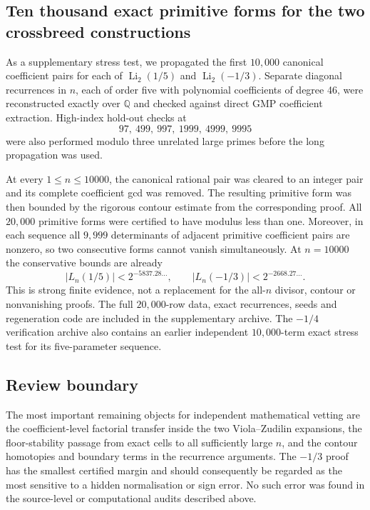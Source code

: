 \documentclass[11pt]{amsart}
\newcommand{\Li}{\operatorname{Li}}
\newcommand{\Q}{\mathbb Q}
\theoremstyle{plain}
\theoremstyle{remark}\newtheorem{remark}[theorem]{Remark}
\numberwithin{equation}{section}
\begin{document}
\subsection{Ten thousand exact primitive forms for the two crossbreed constructions}
As a supplementary stress test, we propagated the first $10{,}000$ canonical coefficient pairs for each of $\Li_2(1/5)$ and $\Li_2(-1/3)$.  Separate diagonal recurrences in $n$, each of order five with polynomial coefficients of degree 46, were reconstructed exactly over $\Q$ and checked against direct GMP coefficient extraction.  High-index hold-out checks at
\[
 97,\ 499,\ 997,\ 1999,\ 4999,\ 9995
\]
were also performed modulo three unrelated large primes before the long propagation was used.

At every $1\le n\le10000$, the canonical rational pair was cleared to an integer pair and its complete coefficient gcd was removed.  The resulting primitive form was then bounded by the rigorous contour estimate from the corresponding proof.  All $20{,}000$ primitive forms were certified to have modulus less than one.  Moreover, in each sequence all $9{,}999$ determinants of adjacent primitive coefficient pairs are nonzero, so two consecutive forms cannot vanish simultaneously.  At $n=10000$ the conservative bounds are already
\[
 |L_n(1/5)|<2^{-5837.28\ldots},\qquad
 |L_n(-1/3)|<2^{-2668.27\ldots}.
\]
This is strong finite evidence, not a replacement for the all-$n$ divisor, contour or nonvanishing proofs.  The full $20{,}000$-row data, exact recurrences, seeds and regeneration code are included in the supplementary archive.  The $-1/4$ verification archive also contains an earlier independent $10{,}000$-term exact stress test for its five-parameter sequence.

\subsection{Review boundary}
The most important remaining objects for independent mathematical vetting are the coefficient-level factorial transfer inside the two Viola--Zudilin expansions, the floor-stability passage from exact cells to all sufficiently large $n$, and the contour homotopies and boundary terms in the recurrence arguments.  The $-1/3$ proof has the smallest certified margin and should consequently be regarded as the most sensitive to a hidden normalisation or sign error.  No such error was found in the source-level or computational audits described above.
\end{document}
